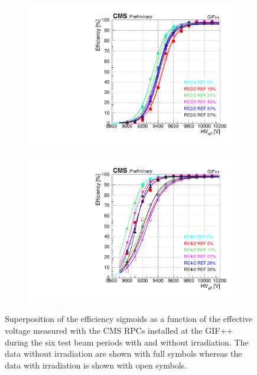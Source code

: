 \begin{figure}[H]
\begin{subfigure}{0.5\linewidth}
    		\includegraphics[width = \linewidth]{fig/chapt5/efficiency_vs_HVeff_RE2_2-REF.pdf}
        	\caption{\label{fig:GIFpp_eff_vs_HVeff:C}}
    	\end{subfigure}
    	\begin{subfigure}{0.5\linewidth}
			\centering
    		\includegraphics[width = \linewidth]{fig/chapt5/efficiency_vs_HVeff_RE4_2-REF.pdf}
        	\caption{\label{fig:GIFpp_eff_vs_HVeff:D}}
    	\end{subfigure}
		\caption{\label{fig:GIFpp_eff_vs_HVeff} Superposition of the efficiency sigmoids as a function of the effective voltage measured with the CMS RPCs installed at the GIF++ during the six test beam periods with and without irradiation. The data without irradiation are shown with full symbols whereas the data with irradiation is shown with open symbols.}
	\end{figure}
	
